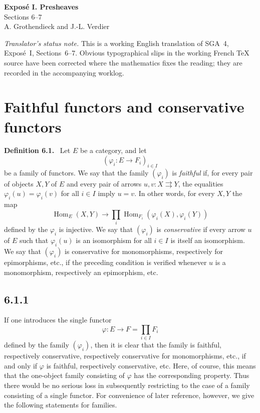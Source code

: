 \documentclass[11pt]{article}
\newcommand{\Hom}{\operatorname{Hom}}
\newenvironment{statement}[1]{\par\medskip\noindent\textbf{#1.}\ }{\par\medskip}
\begin{document}
\begin{center}
{\Large \textbf{Expos\'e I. Presheaves}}\\[0.35em]
{\large Sections 6--7}\\[0.35em]
A. Grothendieck and J.-L. Verdier
\end{center}

\bigskip

\noindent\emph{Translator's status note.} This is a working English translation of SGA~4, Expos\'e~I, Sections~6--7. Obvious typographical slips in the working French \TeX{} source have been corrected where the mathematics fixes the reading; they are recorded in the accompanying worklog.

\setcounter{section}{5}
\section{Faithful functors and conservative functors}

\begin{statement}{Definition 6.1}
Let $E$ be a category, and let
\[
(\varphi_i:E\to F_i)_{i\in I}
\]
be a family of functors. We say that the family $(\varphi_i)$ is \emph{faithful} if, for every pair of objects $X,Y$ of $E$ and every pair of arrows $u,v:X\rightrightarrows Y$, the equalities $\varphi_i(u)=\varphi_i(v)$ for all $i\in I$ imply $u=v$. In other words, for every $X,Y$ the map
\[
\Hom_E(X,Y)\longrightarrow \prod_i \Hom_{F_i}(\varphi_i(X),\varphi_i(Y))
\]
defined by the $\varphi_i$ is injective. We say that $(\varphi_i)$ is \emph{conservative} if every arrow $u$ of $E$ such that $\varphi_i(u)$ is an isomorphism for all $i\in I$ is itself an isomorphism. We say that $(\varphi_i)$ is conservative for monomorphisms, respectively for epimorphisms, etc., if the preceding condition is verified whenever $u$ is a monomorphism, respectively an epimorphism, etc.
\end{statement}

\subsection*{6.1.1}
If one introduces the single functor
\[
\varphi:E\longrightarrow F=\prod_{i\in I}F_i
\]
defined by the family $(\varphi_i)$, then it is clear that the family is faithful, respectively conservative, respectively conservative for monomorphisms, etc., if and only if $\varphi$ is faithful, respectively conservative, etc. Here, of course, this means that the one-object family consisting of $\varphi$ has the corresponding property. Thus there would be no serious loss in subsequently restricting to the case of a family consisting of a single functor. For convenience of later reference, however, we give the following statements for families.
\end{document}

